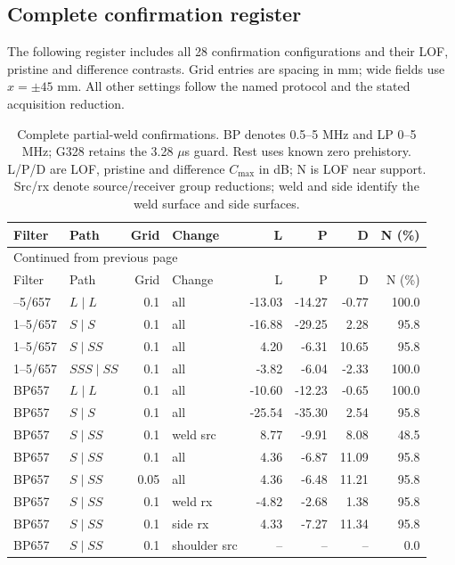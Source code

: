 \documentclass[11pt]{article}
\begin{document}
\subsection{Complete confirmation register}
The following register includes all 28 confirmation configurations and their LOF, pristine and difference contrasts. Grid entries are spacing in mm; wide fields use $x=\pm45$ mm. All other settings follow the named protocol and the stated acquisition reduction.
{\small\setlength{\tabcolsep}{4pt}
\begin{longtable}{@{}llrlrrrr@{}}
\caption{Complete partial-weld confirmations. BP denotes 0.5--5 MHz and LP 0--5 MHz; G328 retains the 3.28 $\mu$s guard. Rest uses known zero prehistory. L/P/D are LOF, pristine and difference $C_{\max}$ in dB; N is LOF near support. Src/rx denote source/receiver group reductions; weld and side identify the weld surface and side surfaces.}\label{saft:archive:partial:register}\\
\toprule Filter & Path & Grid & Change & L & P & D & N (\%)\\\midrule\endfirsthead
\multicolumn{8}{l}{\small Continued from previous page}\\\toprule Filter & Path & Grid & Change & L & P & D & N (\%)\\\midrule\endhead
\bottomrule\endfoot
1--5/657 & $L\mid L$ & 0.1 & all & -13.03 & -14.27 & -0.77 & 100.0 \\
1--5/657 & $S\mid S$ & 0.1 & all & -16.88 & -29.25 & 2.28 & 95.8 \\
1--5/657 & $S\mid SS$ & 0.1 & all & 4.20 & -6.31 & 10.65 & 95.8 \\
1--5/657 & $SSS\mid SS$ & 0.1 & all & -3.82 & -6.04 & -2.33 & 100.0 \\
BP657 & $L\mid L$ & 0.1 & all & -10.60 & -12.23 & -0.65 & 100.0 \\
BP657 & $S\mid S$ & 0.1 & all & -25.54 & -35.30 & 2.54 & 95.8 \\
BP657 & $S\mid SS$ & 0.1 & weld src & 8.77 & -9.91 & 8.08 & 48.5 \\
BP657 & $S\mid SS$ & 0.1 & all & 4.36 & -6.87 & 11.09 & 95.8 \\
BP657 & $S\mid SS$ & 0.05 & all & 4.36 & -6.48 & 11.21 & 95.8 \\
BP657 & $S\mid SS$ & 0.1 & weld rx & -4.82 & -2.68 & 1.38 & 95.8 \\
BP657 & $S\mid SS$ & 0.1 & side rx & 4.33 & -7.27 & 11.34 & 95.8 \\
BP657 & $S\mid SS$ & 0.1 & shoulder src & -- & -- & -- & 0.0 \\

\end{longtable}}
\end{document}
